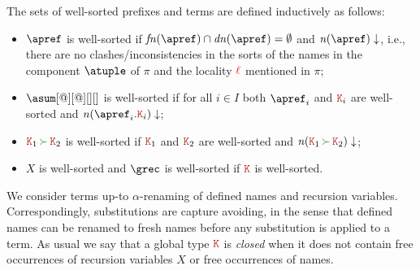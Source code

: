 The sets of well-sorted prefixes and terms are defined inductively as
follows:
\begin{itemize}
\item $\apref$ is well-sorted if $\fn\apref\cap\dn\apref = \emptyset$ and  
$\consistent{\names\apref}$, i.e., there are no clashes/inconsistencies in the sorts of 
the names in the component $\atuple$ of $\pi$ and the locality ${\color{red}\ell}$ mentioned in $\pi$;
\item $\asum[@][@][][]$ is well-sorted if for all ${i\in I}$ both
  $\apref_i$ and ${\aK_i}$ are well-sorted and
  $\consistent{\names {\apref_i.\aK_i}}$; 
  \item $\aK_1 \seqop \aK_2$ is well-sorted if $\aK_1$ and $\aK_2$ are
  well-sorted and $\consistent{\names{\aK_1 \seqop \aK_2}}$;
\item $X$ is well-sorted and $\grec$ is well-sorted if $\aK$ is
  well-sorted.
\end{itemize}


We consider terms up-to $\alpha$-renaming of defined names and
recursion variables.
%
Correspondingly, substitutions are capture avoiding, in the sense that
defined names can be renamed to fresh names before any substitution is
applied to a term.
%
As usual we say that a global type $\aK$ is \emph{closed} when it does
not contain free occurrences of recursion variables $X$ or free
occurrences of names.%


  
